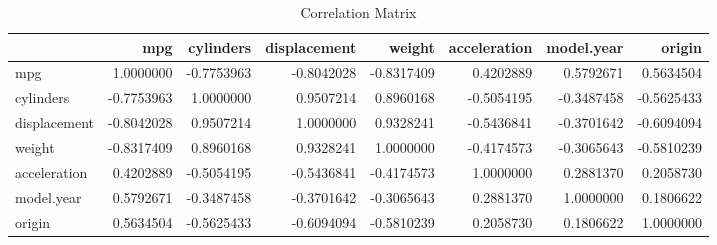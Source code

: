 \begin{table}[h!]
\centering
\begin{tabular}{lrrrrrrr}
\hline
 & mpg & cylinders & displacement & weight & acceleration & model.year & origin \\
\hline
mpg & 1.0000000 & -0.7753963 & -0.8042028 & -0.8317409 & 0.4202889 & 0.5792671 & 0.5634504 \\
cylinders & -0.7753963 & 1.0000000 & 0.9507214 & 0.8960168 & -0.5054195 & -0.3487458 & -0.5625433 \\
displacement & -0.8042028 & 0.9507214 & 1.0000000 & 0.9328241 & -0.5436841 & -0.3701642 & -0.6094094 \\
weight & -0.8317409 & 0.8960168 & 0.9328241 & 1.0000000 & -0.4174573 & -0.3065643 & -0.5810239 \\
acceleration & 0.4202889 & -0.5054195 & -0.5436841 & -0.4174573 & 1.0000000 & 0.2881370 & 0.2058730 \\
model.year & 0.5792671 & -0.3487458 & -0.3701642 & -0.3065643 & 0.2881370 & 1.0000000 & 0.1806622 \\
origin & 0.5634504 & -0.5625433 & -0.6094094 & -0.5810239 & 0.2058730 & 0.1806622 & 1.0000000 \\
\hline
\end{tabular}
\caption{Correlation Matrix}
\end{table}
